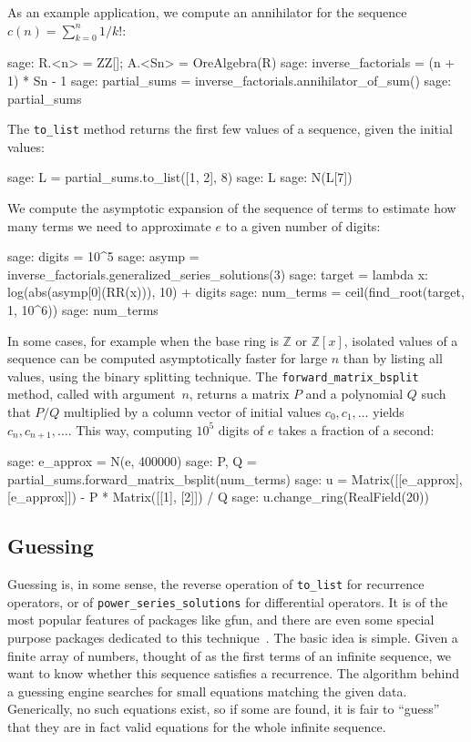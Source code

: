 \documentclass[11pt]{amsart}
\begin{document}
As an example application, we compute an annihilator for the sequence
$c(n) = \sum_{k=0}^n 1 / k!$:

\begin{sageexample}
  sage: R.<n> = ZZ[]; A.<Sn> = OreAlgebra(R)
  sage: inverse_factorials = (n + 1) * Sn - 1
  sage: partial_sums = inverse_factorials.annihilator_of_sum()
  sage: partial_sums
\end{sageexample}

The \verb|to_list| method returns the first few values of a sequence,
given the initial values:

\begin{sageexample}
  sage: L = partial_sums.to_list([1, 2], 8)
  sage: L
  sage: N(L[7])
\end{sageexample}

We compute the asymptotic expansion of the sequence of terms
to estimate how many terms we need to approximate $e$ to a given
number of digits:

\begin{sageexample}
  sage: digits = 10^5
  sage: asymp = inverse_factorials.generalized_series_solutions(3)
  sage: target = lambda x: log(abs(asymp[0](RR(x))), 10) + digits
  sage: num_terms = ceil(find_root(target, 1, 10^6))
  sage: num_terms
\end{sageexample}

In some cases, for example when the base ring is $\mathbb{Z}$ or
$\mathbb{Z}[x]$, isolated values of a sequence can be
computed asymptotically faster for large $n$ than by listing all
values, using the binary splitting technique.
The \verb|forward_matrix_bsplit| method, called with argument~$n$,
returns a matrix $P$ and a polynomial $Q$ such that $P / Q$ multiplied by a
column vector of initial values $c_0, c_1, \ldots$
yields $c_n, c_{n+1}, \ldots$.
This way, computing $10^5$ digits of $e$ takes a fraction of a second:

\begin{sageexample}
  sage: e_approx = N(e, 400000)
  sage: P, Q = partial_sums.forward_matrix_bsplit(num_terms)
  sage: u = Matrix([[e_approx], [e_approx]]) - P * Matrix([[1], [2]]) / Q
  sage: u.change_ring(RealField(20))
\end{sageexample}

\subsection{Guessing}

Guessing is, in some sense, the reverse operation of \verb|to_list| for
recurrence operators, or of \verb|power_series_solutions| for differential
operators.  It is of the most popular features of packages like gfun, and there
are even some special purpose packages dedicated to this
technique~\cite{kauers09a,hebisch11}. The basic idea is simple. Given
a finite array of numbers, thought of as the first terms of an infinite
sequence, we want to know whether this sequence satisfies a recurrence. The
algorithm behind a guessing engine searches for small equations matching the
given data.  Generically, no such equations exist, so if some are found, it is
fair to ``guess'' that they are in fact valid equations for the whole infinite
sequence.
\end{document}
